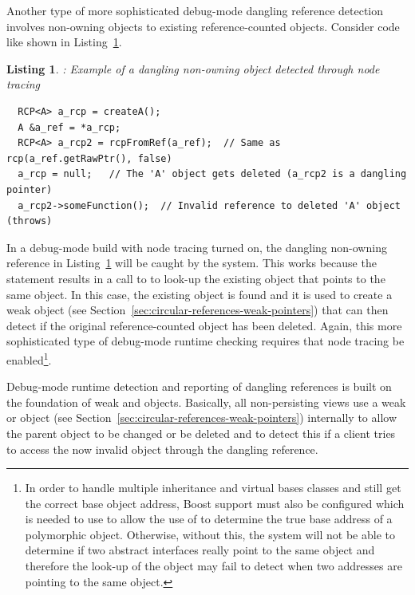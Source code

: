 \documentclass[pdf,ps2pdf,11pt]{SANDreport}
\newtheorem{listing}{Listing}
\begin{document}
Another type of more sophisticated debug-mode dangling reference
detection involves non-owning {} objects to existing
reference-counted objects.  Consider code like shown in
Listing~\ref{listing:RCP-nonowning-dangling-ref}.


{}\begin{listing}: Example of a dangling non-owning {} object
detected through node tracing
\label{listing:RCP-nonowning-dangling-ref}
{\small\begin{verbatim}
  RCP<A> a_rcp = createA();
  A &a_ref = *a_rcp;
  RCP<A> a_rcp2 = rcpFromRef(a_ref);  // Same as rcp(a_ref.getRawPtr(), false)
  a_rcp = null;   // The 'A' object gets deleted (a_rcp2 is a dangling pointer)
  a_rcp2->someFunction();  // Invalid reference to deleted 'A' object (throws)
\end{verbatim}}
\end{listing}


In a debug-mode build with node tracing turned on, the dangling
non-owning {} reference {} in
Listing~\ref{listing:RCP-nonowning-dangling-ref} will be caught by the
system.  This works because the statement {}
results in a call to {} to
look-up the existing {} object that points to the same
{} object.  In this case, the existing {} object
is found and it is used to create a weak {} object (see
Section~\ref{sec:circular-references-weak-pointers}) that can then
detect if the original reference-counted object has been deleted.
Again, this more sophisticated type of debug-mode runtime checking
requires that node tracing be enabled\footnote{In order to handle
multiple inheritance and virtual bases classes and still get the
correct base object address, Boost support must also be configured
which is needed to use {} to allow the use
of {} to determine the true base
address of a polymorphic object.  Otherwise, without this, the system
will not be able to determine if two abstract interfaces really point
to the same object and therefore the look-up of the {}
object may fail to detect when two addresses are pointing to the same
object.}.

Debug-mode runtime detection and reporting of dangling references is
built on the foundation of weak {} and {}
objects.  Basically, all non-persisting views use a weak {}
or {} object (see
Section~\ref{sec:circular-references-weak-pointers}) internally to
allow the parent object to be changed or be deleted and to detect this
if a client tries to access the now invalid object through the
dangling reference.
\end{document}
